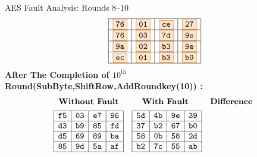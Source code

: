 \documentclass{beamer}
\newenvironment{tres important}[2][]{
	\setkeys{EmphEqEnv}{#2}
	\setkeys{EmphEqOpt}{box={\setlength{\fboxsep}{10pt}\fcolorbox{myNewColorA}{white}},#1}
	\EmphEqMainEnv}
{\endEmphEqMainEnv}
\begin{document}
\begin{frame}[fragile]{AES Fault Analysis: Rounds 8–10}
\[\begin{array}{ccc}
    \begin{array}{|c|c|c|c|}
        \hline
        \fcolorbox{orange!80!black}{orange!20}{\texttt{76}} & \fcolorbox{orange!80!black}{orange!20}{\texttt{01}} & \fcolorbox{orange!80!black}{orange!20}{\texttt{ce}} & \fcolorbox{orange!80!black}{orange!20}{\texttt{27}} \\
        \hline
        \fcolorbox{orange!80!black}{orange!20}{\texttt{76}} & \fcolorbox{orange!80!black}{orange!20}{\texttt{03}} & \fcolorbox{orange!80!black}{orange!20}{\texttt{7d}} & \fcolorbox{orange!80!black}{orange!20}{\texttt{9e}} \\
        \hline
        \fcolorbox{orange!80!black}{orange!20}{\texttt{9a}} & \fcolorbox{orange!80!black}{orange!20}{\texttt{02}} & \fcolorbox{orange!80!black}{orange!20}{\texttt{b3}} & \fcolorbox{orange!80!black}{orange!20}{\texttt{9e}} \\
        \hline
        \fcolorbox{orange!80!black}{orange!20}{\texttt{ec}} & \fcolorbox{orange!80!black}{orange!20}{\texttt{01}} & \fcolorbox{orange!80!black}{orange!20}{\texttt{b3}} & \fcolorbox{orange!80!black}{orange!20}{\texttt{b9}} \\
        \hline
    \end{array}
\end{array}
\]
\textbf{After The Completion of $10^{\text{th}}$ Round(SubByte,ShiftRow,AddRoundkey(10)) :}
\[
\begin{array}{ccc}
\textbf{Without Fault} & \textbf{With Fault } & \textbf{Difference } \\[1ex]
\begin{array}{|c|c|c|c|}
    \hline
    \texttt{f5} & \texttt{03} & \texttt{e7} & \texttt{96} \\
    \hline
    \texttt{d3} & \texttt{b9} & \texttt{85} & \texttt{fd} \\
    \hline
    \texttt{d5} & \texttt{69} & \texttt{89} & \texttt{ba} \\
    \hline
    \texttt{85} & \texttt{9d} & \texttt{5a} & \texttt{af} \\
    \hline
\end{array} 
&

\begin{array}{|c|c|c|c|}
    \hline
    \texttt{5d} & \texttt{4b} & \texttt{9e} & \texttt{39} \\
    \hline
    \texttt{37} & \texttt{b2} & \texttt{67} & \texttt{b0} \\
    \hline
    \texttt{58} & \texttt{0b} & \texttt{58} & \texttt{2d} \\
    \hline
    \texttt{b2} & \texttt{7c} & \texttt{55} & \texttt{ab} \\
    \hline
    \end{array}


\end{array}\]
\end{frame}
\end{document}
